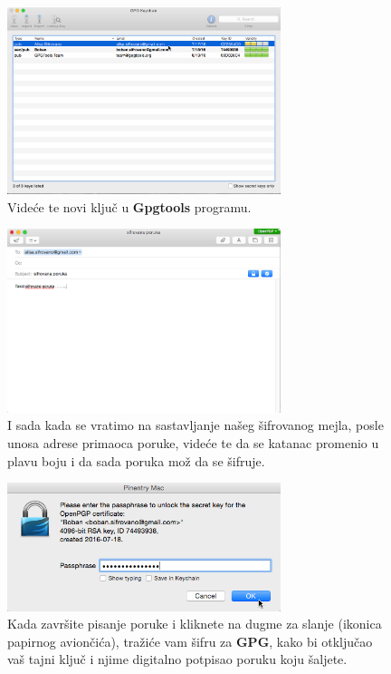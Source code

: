 \documentclass[a4paper,11pt]{article}
\begin{document}
\newpage
\begin{figure}[!h]
	\begin{center}
		\includegraphics[width=8cm]{22_Oracle_VM_VirtualBox.png}
		\caption{Vide\'{c}e te novi klju\v{c} u \textbf{Gpgtools} programu.}
		\label{gpgtools_email_setup12}
	\end{center}
\end{figure}
\begin{figure}[!h]
	\begin{center}
		\includegraphics[width=8cm]{23_Oracle_VM_VirtualBox.png}
		\caption{I sada kada se vratimo na sastavljanje na\v{s}eg \v{s}ifrovanog mejla, posle unosa adrese primaoca poruke, vide\'{c}e te da se katanac promenio u plavu boju i da sada poruka mo\v{z} da se \v{s}ifruje.}
		\label{gpgtools_email_setup13}
	\end{center}
\end{figure}
\newpage

\begin{figure}[!h]
	\begin{center}
		\includegraphics[width=8cm]{24_Oracle_VM_VirtualBox.png}
		\caption{Kada zavr\v{s}ite pisanje poruke i kliknete na dugme za slanje \newline(ikonica papirnog avion\v{c}i\'{c}a), tra\v{z}i\'{c}e vam \v{s}ifru za \textbf{GPG}, kako bi otklju\v{c}ao va\v{s} tajni klju\v{c} i njime digitalno potpisao poruku koju \v{s}aljete.}
		\label{gpgtools_email_setup14}
	\end{center}
\end{figure}
\end{document}
